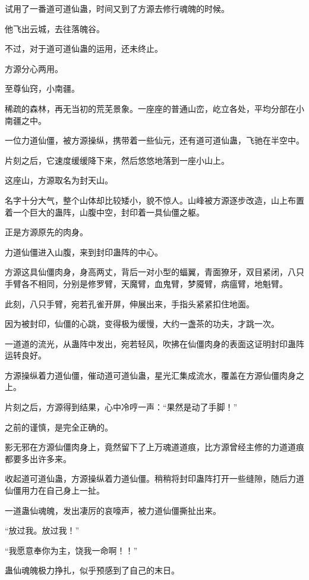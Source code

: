 
\begin{this_body}

试用了一番道可道仙蛊，时间又到了方源去修行魂魄的时候。

他飞出云城，去往落魄谷。

不过，对于道可道仙蛊的运用，还未终止。

方源分心两用。

至尊仙窍，小南疆。

稀疏的森林，再无当初的荒芜景象。一座座的普通山峦，屹立各处，平均分部在小南疆之中。

一位力道仙僵，被方源操纵，携带着一些仙元，还有道可道仙蛊，飞驰在半空中。

片刻之后，它速度缓缓降下来，然后悠悠地落到一座小山上。

这座山，方源取名为封天山。

名字十分大气，整个山体却比较矮小，貌不惊人。山峰被方源逐步改造，山上布置着一个巨大的蛊阵，山腹中空，封印着一具仙僵之躯。

正是方源原先的肉身。

力道仙僵进入山腹，来到封印蛊阵的中心。

方源这具仙僵肉身，身高两丈，背后一对小型的蝠翼，青面獠牙，双目紧闭，八只手臂各不相同，分别是修罗臂，天魔臂，血鬼臂，梦魇臂，病瘟臂，地魁臂。

此刻，八只手臂，宛若孔雀开屏，伸展出来，手指头紧紧扣住地面。

因为被封印，仙僵的心跳，变得极为缓慢，大约一盏茶的功夫，才跳一次。

一道道的流光，从蛊阵中发出，宛若轻风，吹拂在仙僵肉身的表面这证明封印蛊阵运转良好。

方源操纵着力道仙僵，催动道可道仙蛊，星光汇集成流水，覆盖在方源仙僵肉身之上。

片刻之后，方源得到结果，心中冷哼一声：“果然是动了手脚！”

之前的谨慎，是完全正确的。

影无邪在方源仙僵肉身上，竟然留下了上万魂道道痕，比方源曾经主修的力道道痕都要多出许多来。

收起道可道仙蛊，方源操纵着力道仙僵。稍稍将封印蛊阵打开一些缝隙，随后力道仙僵用力在自己身上一扯。

一道蛊仙魂魄，发出凄厉的哀嚎声，被力道仙僵撕扯出来。

“放过我。放过我！”

“我愿意奉你为主，饶我一命啊！！”

蛊仙魂魄极力挣扎，似乎预感到了自己的末日。


\end{this_body}
